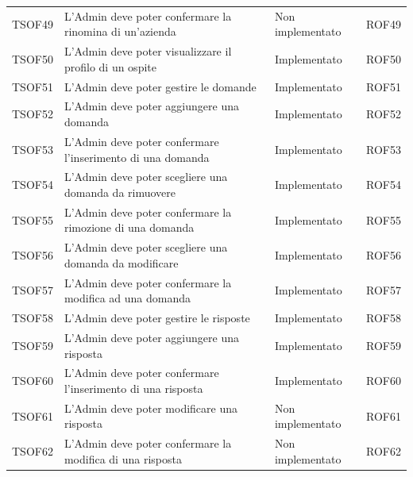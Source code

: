 \documentclass[../PianoDiQualifica_v4.0.0.tex]{subfiles}
\begin{document}
\begin{longtable}[c] { >{\centering\arraybackslash}p{2cm} p{7cm} >{\centering\arraybackslash}p{4cm} >{\centering\arraybackslash}p{2cm}}
			\addlinespace[0.3em]
			\midrule
			\addlinespace[0.3em]
			TSOF49 & L'Admin deve poter confermare la rinomina di un'azienda & Non implementato & ROF49 \\
			\addlinespace[0.3em]
			\midrule
			\addlinespace[0.3em]
			TSOF50 & L'Admin deve poter visualizzare il profilo di un ospite & Implementato & ROF50 \\
			\addlinespace[0.3em]
			\midrule
			\addlinespace[0.3em]
			TSOF51 & L'Admin deve poter gestire le domande & Implementato & ROF51 \\
			\addlinespace[0.3em]
			\midrule
			\addlinespace[0.3em]
			TSOF52 & L'Admin deve poter aggiungere una domanda & Implementato & ROF52 \\
			\addlinespace[0.3em]
			\midrule
			\addlinespace[0.3em]
			TSOF53 & L'Admin deve poter confermare l'inserimento di una domanda & Implementato & ROF53 \\
			\addlinespace[0.3em]
			\midrule
			\addlinespace[0.3em]
			TSOF54 & L'Admin deve poter scegliere una domanda da rimuovere	& Implementato & ROF54 \\
			\addlinespace[0.3em]
			\midrule
			\addlinespace[0.3em]
			TSOF55 & L'Admin deve poter confermare la rimozione di una domanda & Implementato & ROF55 \\
			\addlinespace[0.3em]
			\midrule
			\addlinespace[0.3em]
			TSOF56 & L'Admin deve poter scegliere una domanda da modificare	 & Implementato & ROF56 \\
			\addlinespace[0.3em]
			\midrule
			\addlinespace[0.3em]
			TSOF57 & L'Admin deve poter confermare la modifica ad una domanda & Implementato & ROF57 \\
			\addlinespace[0.3em]
			\midrule
			\addlinespace[0.3em]
			TSOF58 & L'Admin deve poter gestire le risposte & Implementato & ROF58 \\
			\addlinespace[0.3em]
			\midrule
			\addlinespace[0.3em]
			TSOF59 & L'Admin deve poter aggiungere una risposta & Implementato & ROF59 \\
			\addlinespace[0.3em]
			\midrule
			\addlinespace[0.3em]
			TSOF60 & L'Admin deve poter confermare l'inserimento di una risposta & Implementato & ROF60 \\
			\addlinespace[0.3em]
			\midrule
			\addlinespace[0.3em]
			TSOF61 & L'Admin deve poter modificare una risposta & Non implementato & ROF61 \\
			\addlinespace[0.3em]
			\midrule
			\addlinespace[0.3em]
			TSOF62 & L'Admin deve poter confermare la modifica di una risposta & Non implementato & ROF62 \\

\end{longtable}
\end{document}
